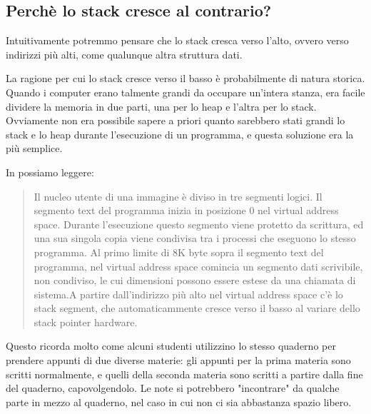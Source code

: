 \subsection{Perchè lo stack cresce al contrario?}
\label{stack_grow_backwards}

Intuitivamente potremmo pensare che lo stack cresca verso l'alto, ovvero verso indirizzi più alti, come qualunque altra struttura dati.

La ragione per cui lo stack cresce verso il basso è probabilmente di natura storica.
Quando i computer erano talmente grandi da occupare un'intera stanza, era facile dividere la memoria in due parti, una per lo
\gls{heap} e l'altra per lo stack.
Ovviamente non era possibile sapere a priori quanto sarebbero stati grandi lo stack e lo \gls{heap} durante l'esecuzione di un programma,
e questa soluzione era la più semplice.



In \RitchieThompsonUNIX possiamo leggere:

\begin{framed}
\begin{quotation}
Il nucleo utente di una immagine è diviso in tre segmenti logici.
Il segmento text del programma inizia in posizione 0 nel virtual address space.
Durante l'esecuzione questo segmento viene protetto da scrittura, ed una sua singola copia viene condivisa tra i processi che eseguono lo stesso programma.
Al primo limite di 8K byte sopra il segmento text del programma, nel virtual address space comincia un segmento dati scrivibile, non condiviso, le cui dimensioni possono essere estese da una chiamata di sistema.A partire dall'indirizzo più alto nel virtual address space c'è lo stack segment, che automaticammente cresce verso il basso al variare dello stack pointer hardware.
\end{quotation}
\end{framed}

Questo ricorda molto come alcuni studenti utilizzino lo stesso quaderno per prendere appunti di due diverse materie:
gli appunti per la prima materia sono scritti normalmente, e quelli della seconda materia sono scritti a partire dalla fine del quaderno, capovolgendolo.
Le note si potrebbero "incontrare" da qualche parte in mezzo al quaderno, nel caso in cui non ci sia abbastanza spazio libero.


